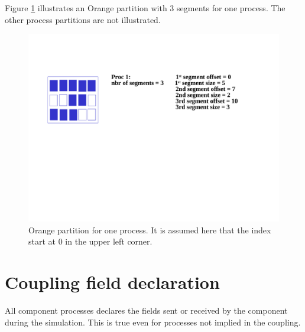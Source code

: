 Figure \ref{orange_partition} illustrates an Orange partition with 3 segments
for one process. The other process partitions are not illustrated.

\begin{figure}
\includegraphics[scale=.6]{figures/orange_new} 
\caption{Orange partition for one process. It is assumed here that the index start at 0 in the upper left corner.}
\label{orange_partition}
\end{figure} 


\section{Coupling field declaration}
 \label{subsubsec_Declaration}

All component processes declares the fields sent
or received by the component during the simulation. This is
  true even for processes not implied in the coupling.

